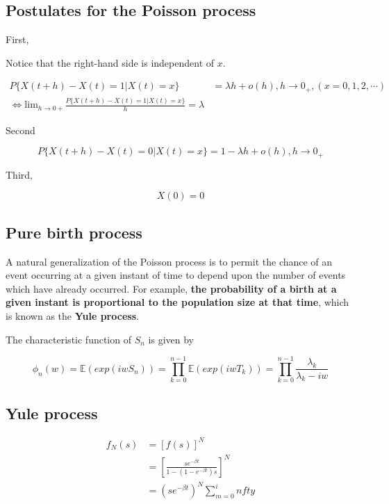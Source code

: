 \documentclass[12pt]{article}
\theoremstyle{nonumberbreak}
\begin{document}
\subsection{Postulates for the Poisson process}


First, 

Notice that the right-hand side is independent of $x$. 

$$
\begin{aligned}
P\{ X(t+h) - X(t) = 1 | X(t) = x \} &= \lambda h + o(h), h \to 0_+, (x=0,1,2,\cdots) \\[10pt]
\Leftrightarrow \mathrm{lim}_{h \to 0+} \frac{P\{ X(t+h) - X(t) = 1 | X(t) = x \}}{h} = \lambda
\end{aligned}
$$



Second


$$
P\{ X(t+h) - X(t) = 0 | X(t) = x \} = 1 - \lambda h + o(h), h \to 0_+
$$


Third,

$$
X(0) = 0 
$$


\subsection{Pure birth process}

A natural generalization of the Poisson process is to permit the chance of
an event occurring at a given instant of time to depend upon the number of events which have already occurred. For example, \textbf{the probability of a birth at a given instant is proportional to the population size at that time}, which is known as the \textbf{Yule process}.




The characteristic function of $S_n$ is given by

$$
\phi_n(w) = \mathbb{E}(exp(iwS_n)) = \prod_{k=0}^{n-1} \mathbb{E}(exp(iw T_k)) = \prod_{k=0}^{n-1} \frac{\lambda_k}{\lambda_k - iw}
$$


\subsection{Yule process}



$$
\begin{aligned}
f_N(s) &= [f(s)]^N \\[8pt]
&= \left[ \frac{se^{-\beta t}}{1 - (1-e^{-\beta t})s} \right]^N \\[8pt]
&= (s e^{-\beta t})^N \sum_{m=0}^infty 
\end{aligned}
$$
\end{document}
